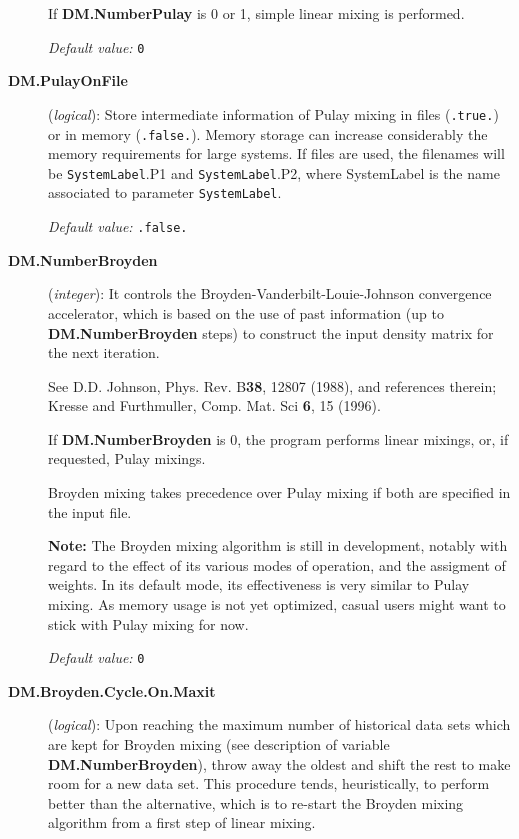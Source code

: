 \documentclass[11pt]{article}
\begin{document}
\begin{description}
If {\bf DM.NumberPulay} is 0 or 1, simple linear mixing is
performed.

{\it Default value:} {\tt 0}

\item[{\bf DM.PulayOnFile}] ({\it logical}): 
Store intermediate information of Pulay mixing in files
({\tt .true.}) or in memory ({\tt .false.}).
Memory storage can increase considerably the
memory requirements for large systems.
If files are used, the filenames will be 
{\tt SystemLabel}.P1 and 
{\tt SystemLabel}.P2,
where SystemLabel is the name associated
to parameter {\tt SystemLabel}.

{\it Default value:} {\tt .false.}

\item[{\bf DM.NumberBroyden}] ({\it integer}): 
It controls the Broyden-Vanderbilt-Louie-Johnson
convergence accelerator, which is based on the use of past information
(up to {\bf DM.NumberBroyden} steps) to construct the input density
matrix for the next iteration.

See D.D. Johnson, Phys. Rev. B{\bf 38}, 12807 (1988), and references therein;
Kresse and Furthmuller, Comp. Mat. Sci {\bf 6}, 15 (1996).

If {\bf DM.NumberBroyden} is 0, the program performs linear mixings,
or, if requested, Pulay mixings.

Broyden mixing takes precedence over Pulay mixing if both are
specified in the input file.

{\bf Note:} The Broyden mixing algorithm is still in development,
notably with regard to the effect of its various modes of operation, and
the assigment of weights. In its default mode, its effectiveness is
very similar to Pulay mixing. As memory usage is not yet optimized,
casual users might want to stick with Pulay mixing for now.

{\it Default value:} {\tt 0}

\item[{\bf DM.Broyden.Cycle.On.Maxit}] ({\it logical}): 
Upon reaching the maximum number of historical data sets which are
kept for Broyden mixing (see description of variable {\bf
  DM.NumberBroyden}), throw away the oldest and shift the rest to make
room for a new data set. This procedure tends, heuristically, to
perform better than the alternative, which is to re-start the Broyden
mixing algorithm from a first step of linear mixing.


\end{description}
\end{document}
